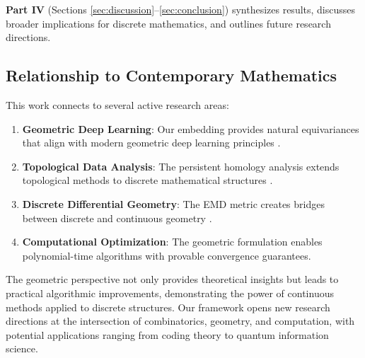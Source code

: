 \textbf{Part IV} (Sections \ref{sec:discussion}--\ref{sec:conclusion}) synthesizes results, discusses broader implications for discrete mathematics, and outlines future research directions.

\subsection{Relationship to Contemporary Mathematics}

This work connects to several active research areas:

\begin{enumerate}
    \item \textbf{Geometric Deep Learning}: Our embedding provides natural equivariances that align with modern geometric deep learning principles \citep{Bronstein2021}.
    
    \item \textbf{Topological Data Analysis}: The persistent homology analysis extends topological methods to discrete mathematical structures \citep{Wasserman2018}.
    
    \item \textbf{Discrete Differential Geometry}: The EMD metric creates bridges between discrete and continuous geometry \citep{Hirani2003}.
    
    \item \textbf{Computational Optimization}: The geometric formulation enables polynomial-time algorithms with provable convergence guarantees.
\end{enumerate}

The geometric perspective not only provides theoretical insights but leads to practical algorithmic improvements, demonstrating the power of continuous methods applied to discrete structures. Our framework opens new research directions at the intersection of combinatorics, geometry, and computation, with potential applications ranging from coding theory to quantum information science. 